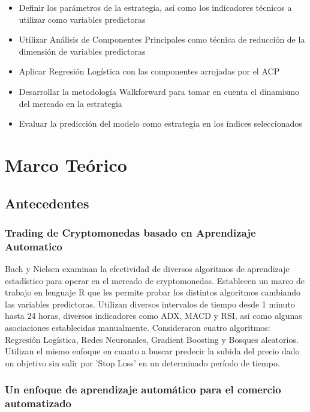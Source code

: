 \documentclass[a4paper,12pt]{Latex/Classes/PhDthesisPSnPDF}
\begin{document}
\begin{itemize}
\item Definir los parámetros de la estrategia, así como los indicadores técnicos a utilizar como variables predictoras
\item Utilizar Análisis de Componentes Principales como técnica de reducción de la dimensión de variables predictoras
\item Aplicar Regresión Logística con las componentes arrojadas por el ACP
\item Desarrollar la metodología Walkforward para tomar en cuenta el dinamismo del mercado en la estrategia
\item Evaluar la predicción del modelo como estrategia en los índices seleccionados
\end{itemize}


\chapter{Marco Teórico}

\section{Antecedentes}

\subsection{Trading de Cryptomonedas basado en Aprendizaje Automatico}

Bach y Nielsen examinan la efectividad de diversos algoritmos de aprendizaje estadístico para operar en el mercado de cryptomonedas. Establecen un marco de trabajo en lenguaje R que les permite probar los distintos algoritmos cambiando las variables predictoras. Utilizan diversos intervalos de tiempo desde 1 minuto hasta 24 horas, diversos indicadores como ADX, MACD y RSI, así como algunas asociaciones establecidas manualmente. Consideraron cuatro algoritmos: Regresión Logística, Redes Neuronales, Gradient Boosting y Bosques aleatorios. Utilizan el mismo enfoque en cuanto a buscar predecir la subida del precio dado un objetivo sin salir por 'Stop Loss' en un determinado período de tiempo.

\subsection{Un enfoque de aprendizaje automático para el comercio automatizado}
\end{document}
